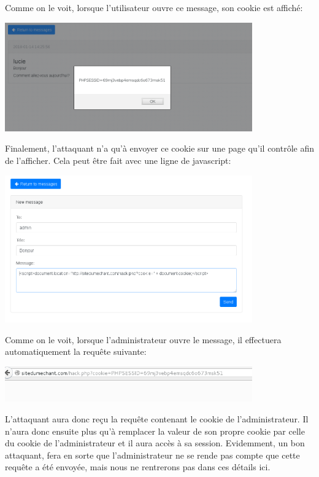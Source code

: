\documentclass{article}
\begin{document}
Comme on le voit, lorsque l'utilisateur ouvre ce message, son cookie est
affiché:

\begin{center}\includegraphics[width=0.8\textwidth]{images/xss4.png}\end{center}

Finalement, l'attaquant n'a qu'à envoyer ce cookie sur une page qu'il
contrôle afin de l'afficher. Cela peut être fait avec une ligne de
javascript:

\begin{center}\includegraphics[width=0.8\textwidth]{images/xss5.png}\end{center}

Comme on le voit, lorsque l'administrateur ouvre le message, il
effectuera automatiquement la requête suivante:

\begin{center}\includegraphics[width=0.8\textwidth]{images/xss6.png}\end{center}

L'attaquant aura donc reçu la requête contenant le cookie de
l'administrateur. Il n'aura donc ensuite plus qu'à remplacer la valeur
de son propre cookie par celle du cookie de l'administrateur et il aura
accès à sa session. Evidemment, un bon attaquant, fera en sorte que
l'administrateur ne se rende pas compte que cette requête a été envoyée,
mais nous ne rentrerons pas dans ces détails ici.
\end{document}
